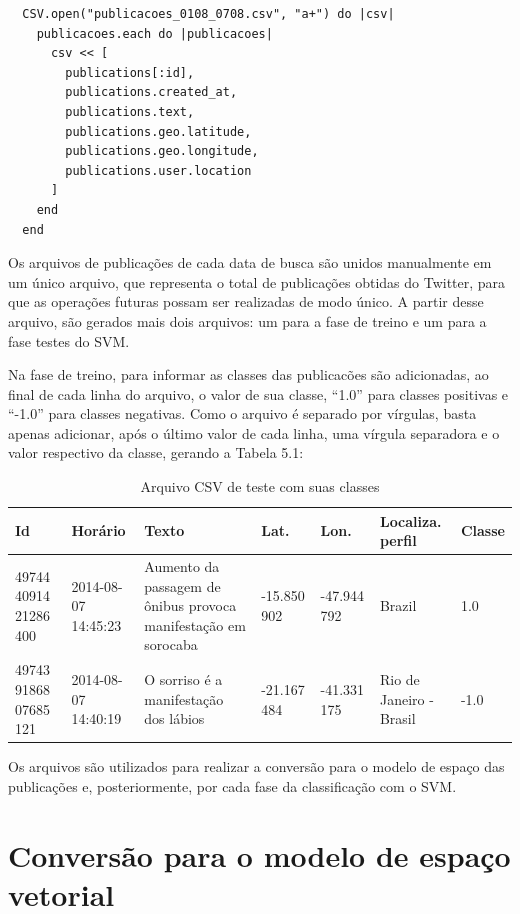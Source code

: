 \begin{lstlisting}
  CSV.open("publicacoes_0108_0708.csv", "a+") do |csv|
    publicacoes.each do |publicacoes| 
      csv << [
        publications[:id], 
        publications.created_at, 
        publications.text, 
        publications.geo.latitude, 
        publications.geo.longitude, 
        publications.user.location
      ]
    end
  end
\end{lstlisting}

Os arquivos de publicações de cada data de busca são unidos manualmente em um único arquivo, que representa o total de publicações obtidas do Twitter, para que as operações futuras possam ser realizadas de modo único. A partir desse arquivo, são gerados mais dois arquivos: um para a fase de treino e um para a fase testes do SVM.

Na fase de treino, para informar as classes das publicacões são adicionadas, ao final de cada linha do arquivo, o valor de sua classe, ``1.0'' para classes positivas e ``-1.0'' para classes negativas. Como o arquivo é separado por vírgulas, basta apenas adicionar, após o último valor de cada linha, uma vírgula separadora e o valor respectivo da classe, gerando a Tabela 5.1:

\begin{table}[ht]
  \caption{Arquivo CSV de teste com suas classes}
  \centering
  \begin{tabular}{| p{1cm} | p{1.7cm} | p{4cm} | p{1.5cm} | p{1.5cm} | p{2cm} | p{1.3cm} | }
    \hline
    \textbf{Id} & \textbf{Horário} & \textbf{Texto} & \textbf{Lat.} &\textbf{Lon.} & \textbf{Localiza. perfil} & \textbf{Classe} \\ [0.5ex] \hline \hline
    49744 40914 21286 400 & 2014-08-07 14:45:23 & Aumento da passagem de ônibus provoca manifestação em sorocaba & -15.850 902 & -47.944 792 & Brazil & 1.0 \\ \hline
    49743 91868 07685 121 & 2014-08-07 14:40:19 & O sorriso é a manifestação dos lábios & -21.167 484 & -41.331 175 & Rio de Janeiro - Brasil & -1.0 \\ \hline
    \hline
  \end{tabular}
  \label{table:nonlin}
\end{table}

Os arquivos são utilizados para realizar a conversão para o modelo de espaço das publicações e, posteriormente, por cada fase da classificação com o SVM.

\section{Conversão para o modelo de espaço vetorial}

